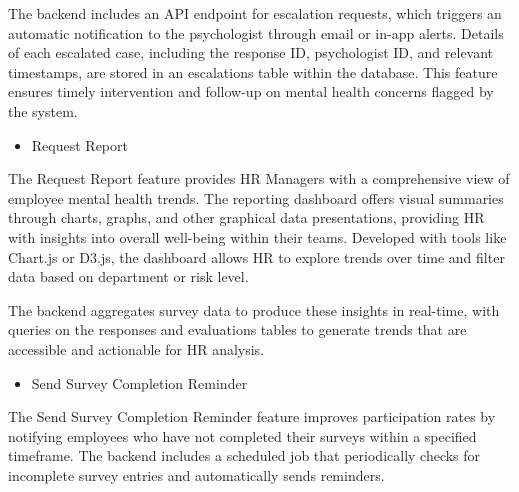 \documentclass[conference]{IEEEtran}
\begin{document}
            The backend includes an API endpoint 
            for escalation requests, which triggers an automatic 
            notification to the psychologist through email or in-app 
            alerts. Details of each escalated case, including the response
            ID, psychologist ID, and relevant timestamps, are stored in an
            escalations table within the database. This feature ensures 
            timely intervention and follow-up on mental health concerns
            flagged by the system.
            \newline    

            \begin{itemize}
                \item Request Report
            \end{itemize}
    
            The Request Report feature provides HR Managers with a 
            comprehensive view of employee mental health trends. The 
            reporting dashboard offers visual summaries through charts, 
            graphs, and other graphical data presentations, providing HR
            with insights into overall well-being within their teams. 
            Developed with tools like Chart.js or D3.js, the dashboard 
            allows HR to explore trends over time and filter data based 
            on department or risk level. \newline
     
            The backend aggregates survey 
            data to produce these insights in real-time, with queries on 
            the responses and evaluations tables to generate trends that 
            are accessible and actionable for HR analysis.
            \newline    

            \begin{itemize}
                \item Send Survey Completion Reminder
            \end{itemize}
    
            The Send Survey Completion Reminder feature improves 
            participation rates by notifying employees who have not 
            completed their surveys within a specified timeframe. The 
            backend includes a scheduled job that periodically checks 
            for incomplete survey entries and automatically sends 
            reminders. \newline
    
\end{document}
